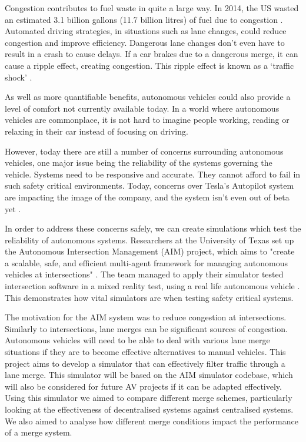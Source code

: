 Congestion contributes to fuel waste in quite a large way. In 2014, the US wasted an estimated 3.1 billion gallons (11.7 billion litres) of fuel due to congestion \citep{Schrank2015}. Automated driving strategies, in situations such as lane changes, could reduce congestion and improve efficiency. Dangerous lane changes don't even have to result in a crash to cause delays. If a car brakes due to a dangerous merge, it can cause a ripple effect, creating congestion. This ripple effect is known as a `traffic shock' \citep{Daganzo1994}.

As well as more quantifiable benefits, autonomous vehicles could also provide a level of comfort not currently available today. In a world where autonomous vehicles are commonplace, it is not hard to imagine people working, reading or relaxing in their car instead of focusing on driving. 

However, today there are still a number of concerns surrounding autonomous vehicles, one major issue being the reliability of the systems governing the vehicle. Systems need to be responsive and accurate. They cannot afford to fail in such safety critical environments. Today, concerns over Tesla's Autopilot system are impacting the image of the company, and the system isn't even out of beta yet \citep{TeslaCriticised}. 

In order to address these concerns safely, we can create simulations which test the reliability of autonomous systems. Researchers at the University of Texas set up the Autonomous Intersection Management (AIM) project, which aims to "create a scalable, safe, and efficient multi-agent framework for managing autonomous vehicles at intersections" \citep{AIMProject}. The team managed to apply their simulator tested intersection software in a mixed reality test, using a real life autonomous vehicle \citep{Quinlan2010}. This demonstrates how vital simulators are when testing safety critical systems.

The motivation for the AIM system was to reduce congestion at intersections. Similarly to intersections, lane merges can be significant sources of congestion. Autonomous vehicles will need to be able to deal with various lane merge situations if they are to become effective alternatives to manual vehicles. This project aims to develop a simulator that can effectively filter traffic through a lane merge. This simulator will be based on the AIM simulator codebase, which will also be considered for future AV projects if it can be adapted effectively. Using this simulator we aimed to compare different merge schemes, particularly looking at the effectiveness of decentralised systems against centralised systems. We also aimed to analyse how different merge conditions impact the performance of a merge system.

